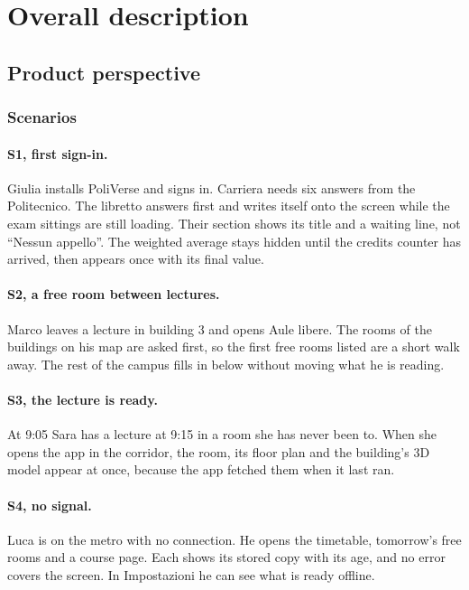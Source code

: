 \section{Overall description}

\subsection{Product perspective}

\subsubsection{Scenarios}

\paragraph{S1, first sign-in.} Giulia installs PoliVerse and signs in. Carriera needs
six answers from the Politecnico. The libretto answers first and writes itself onto
the screen while the exam sittings are still loading. Their section shows its title
and a waiting line, not ``Nessun appello''. The weighted average stays hidden until
the credits counter has arrived, then appears once with its final value.

\paragraph{S2, a free room between lectures.} Marco leaves a lecture in building 3 and
opens Aule libere. The rooms of the buildings on his map are asked first, so the
first free rooms listed are a short walk away. The rest of the campus fills in
below without moving what he is reading.

\paragraph{S3, the lecture is ready.} At 9:05 Sara has a lecture at 9:15 in a room she
has never been to. When she opens the app in the corridor, the room, its floor plan
and the building's 3D model appear at once, because the app fetched them when it
last ran.

\paragraph{S4, no signal.} Luca is on the metro with no connection. He opens the
timetable, tomorrow's free rooms and a course page. Each shows its stored copy with
its age, and no error covers the screen. In Impostazioni he can see what is ready
offline.

